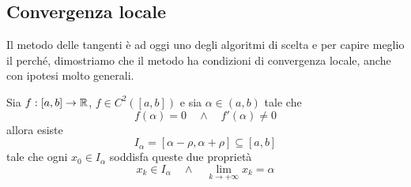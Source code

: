 \subsection{Convergenza locale}
Il metodo delle tangenti è ad oggi uno degli algoritmi di scelta e per capire meglio il perché, dimostriamo
che il metodo ha condizioni di convergenza locale, anche con ipotesi molto generali.

\begin{theorem}
	Sia $f : [a, b] \to \mathbb{R}$, $f \in C^2([a, b])$ e sia $\alpha \in (a, b)$ tale che
	\[ f(\alpha) = 0 \quad \wedge \quad f'(\alpha) \neq 0 \]
	allora esiste
	\[ I_\alpha = [\alpha - \rho, \alpha + \rho] \subseteq [a, b] \]
	tale che ogni $x_0 \in I_\alpha$ soddisfa queste due proprietà
	\[ x_k \in I_\alpha \quad \wedge \quad \lim_{k \to +\infty} x_k = \alpha \]
\end{theorem}